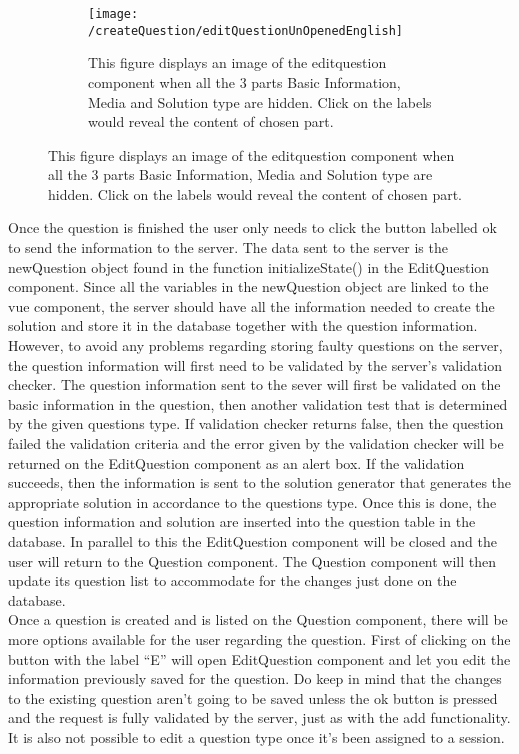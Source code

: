 \begin{figure}[H]
	\centering
	\begin{subfigure}{0.30\linewidth}
		\texttt{[image: /createQuestion/editQuestionUnOpenedEnglish]}
		\caption{This figure displays an image of the editquestion component when all the 3 parts Basic Information, Media and Solution type are hidden. Click on the labels would reveal the content of chosen part.}
		\label{fig:editquestionUnOpened}
	\end{subfigure}
\end{figure}
Once the question is finished the user only needs to click the button labelled ok to send the information to the server. The data sent to the server is the newQuestion object found in the function initializeState() in the EditQuestion component. Since all the variables in the newQuestion object are linked to the vue component, the server should have all the information needed to create the solution and store it in the database together with the question information. However, to avoid any problems regarding storing faulty questions on the server, the question information will first need to be validated by the server's validation checker. The question information sent to the sever will first be validated on the basic information in the question, then another validation test that is determined by the given questions type.  If validation checker returns false, then the question failed the validation criteria and the error given by the validation checker will be returned on the EditQuestion component as an alert box. If the validation succeeds, then the information is sent to the solution generator that generates the appropriate solution in accordance to the questions type. Once this is done, the question information and solution are inserted into the question table in the database. In parallel to this the EditQuestion component will be closed and the user will return to the Question component. The Question component will then update its question list to accommodate for the changes just done on the database.
\\[11pt]
Once a question is created and is listed on the Question component, there will be more options available for the user regarding the question. First of clicking on the button with the label “E” will open EditQuestion component and let you edit the information previously saved for the question. Do keep in mind that the changes to the existing question aren't going to be saved unless the ok button is pressed and the request is fully validated by the server, just as with the add functionality. It is also not possible to edit a question type once it’s been assigned to a session. \\[11pt]
